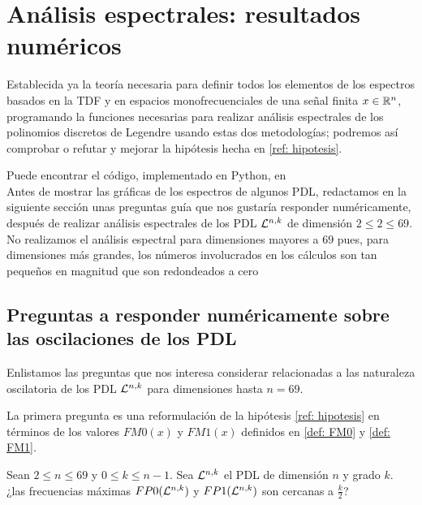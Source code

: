 \chapter{Análisis espectrales: resultados numéricos}
\label{chap: resultados numericos analisis espectrales}

Establecida ya la teoría necesaria
para definir todos los elementos de los espectros
basados en la TDF y en espacios monofrecuenciales 
de una señal finita $x \in \mathbb{R}^{n}$,
programando la funciones necesarias para realizar análisis espectrales
de los polinomios discretos de Legendre
usando estas dos metodologías; podremos así
comprobar o refutar y mejorar
la hipótesis hecha en 
\ref{ref: hipotesis}. 

Puede encontrar el código, implementado en Python,
en  \\

Antes de mostrar las gráficas de los espectros
de algunos PDL, 
redactamos en la siguiente sección unas preguntas guía
que nos gustaría responder numéricamente, después de 
realizar análisis espectrales de los PDL
$\mathcal{L}^{n,k}$ de dimensión $2 \leq 2 \leq 69$. \\

No realizamos el análisis espectral para dimensiones
mayores a $69$ pues, para dimensiones más grandes, los números
involucrados en los cálculos son tan pequeños
en magnitud que son redondeados a cero

\section{Preguntas a responder numéricamente sobre las oscilaciones de los PDL}

Enlistamos las preguntas que nos interesa considerar
relacionadas a las naturaleza oscilatoria
de los PDL $\mathcal{L}^{n,k}$
para dimensiones hasta $n=69$. 

La primera pregunta es una reformulación de la 
hipótesis \ref{ref: hipotesis} en términos de los 
valores $FM0(x)$ y $FM1(x)$ definidos en 
\ref{def: FM0} y \ref{def: FM1}.

\begin{pregunta}
\label{pregunta 1}
Sean $2 \leq n \leq 69$ y $0 \leq k \leq n-1$.
Sea $\mathcal{L}^{n,k}$ el PDL de dimensión $n$ y grado $k$.
¿las frecuencias máximas
$FP0(\mathcal{L}^{n,k})$ y 
$FP1(\mathcal{L}^{n,k})$ son cercanas a $\frac{k}{2}$?
\end{pregunta}

